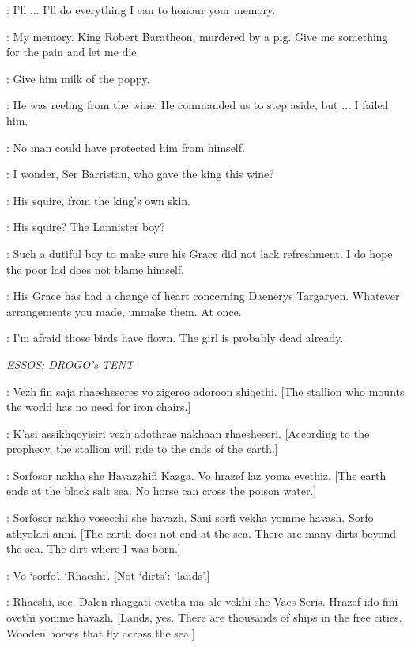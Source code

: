 \NED: I'll $\ldots$ I'll do everything I can to honour your memory. 

\ROBERT: My memory. King Robert Baratheon, murdered by a pig. Give me something for the pain and let me die. 


\NED: Give him milk of the poppy. 

\SELMY: He was reeling from the wine. He commanded us to step aside, but $\ldots$ I failed him. 

\NED: No man could have protected him from himself. 

\VARYS: I wonder, Ser Barristan, who gave the king this wine? 

\SELMY: His squire, from the king's own skin. 

\NED: His squire? The Lannister boy? 

\VARYS: Such a dutiful boy to make sure his Grace did not lack refreshment. I do hope the poor lad does not blame himself. 

\NED: His Grace has had a change of heart concerning Daenerys Targaryen. Whatever arrangements you made, unmake them. At once. 

\VARYS: I'm afraid those birds have flown. The girl is probably dead already. 


\scene

\textit{ESSOS: DROGO's TENT} 


\DROGO: Vezh fin saja rhaesheseres vo zigereo adoroon shiqethi. [The stallion who mounts the world has no need for iron chairs.] 

\DAENERYS: K'asi assikhqoyisiri vezh adothrae nakhaan rhaesheseri. [According to the prophecy, the stallion will ride to the ends of the earth.] 

\DROGO: Sorfosor nakha she Havazzhifi Kazga. Vo hrazef laz yoma evethiz. [The earth ends at the black salt sea. No horse can cross the poison water.] 

\DAENERYS: Sorfosor nakho vosecchi she havazh. Sani sorfi vekha yomme havash. Sorfo athyolari anni. [The earth does not end at the sea. There are many dirts beyond the sea. The dirt where I was born.] 

\DROGO: Vo `sorfo'. `Rhaeshi'. [Not `dirts': `lands'.] 

\DAENERYS: Rhaeshi, sec. Dalen rhaggati evetha ma ale vekhi she Vaes Seris. Hrazef ido fini ovethi yomme havazh. [Lands, yes. There are thousands of ships in the free cities. Wooden horses that fly across the sea.] 

